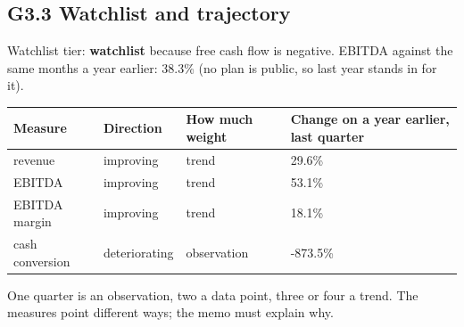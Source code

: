 \documentclass[11pt,a4paper]{article}
\begin{document}
\subsection*{G3.3 Watchlist and trajectory}
Watchlist tier: \textbf{watchlist} because free cash flow is negative. EBITDA against the same months a year earlier: 38.3\% (no plan is public, so last year stands in for it).
\begin{center}\footnotesize\setlength{\tabcolsep}{3.5pt}\begin{tabular}{@{}llll@{}}\toprule
Measure & Direction & How much weight & Change on a year earlier, last quarter \\\midrule
revenue & improving & trend & 29.6\% \\
EBITDA & improving & trend & 53.1\% \\
EBITDA margin & improving & trend & 18.1\% \\
cash conversion & deteriorating & observation & -873.5\% \\
\bottomrule\end{tabular}\end{center}
One quarter is an observation, two a data point, three or four a trend. The measures point different ways; the memo must explain why.
\end{document}
